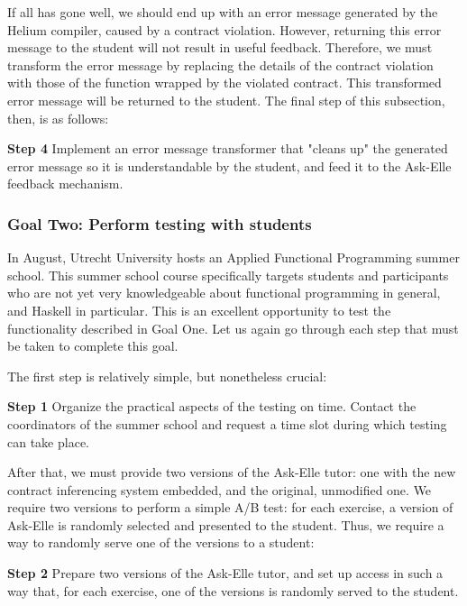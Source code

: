 \documentclass[10pt,a4paper]{article}
\begin{document}
If all has gone well, we should end up with an error message generated by the Helium compiler, caused by a contract violation.
However, returning this error message to the student will not result in useful feedback.
Therefore, we must transform the error message by replacing the details of the contract violation with those of the function wrapped by the violated contract.
This transformed error message will be returned to the student. The final step of this subsection, then, is as follows:

\begin{description}
	\item{\textbf{Step 4}} Implement an error message transformer that "cleans up" the generated error message so it is understandable by the student, and feed it to the Ask-Elle feedback mechanism.
\end{description}

\subsubsection{Goal Two: Perform testing with students}

In August, Utrecht University hosts an Applied Functional Programming summer school.
This summer school course specifically targets students and participants who are not yet very knowledgeable about functional programming in general, and Haskell in particular.
This is an excellent opportunity to test the functionality described in Goal One.
Let us again go through each step that must be taken to complete this goal.

The first step is relatively simple, but nonetheless crucial:

\begin{description}
	\item{\textbf{Step 1}} Organize the practical aspects of the testing on time. Contact the coordinators of the summer school and request a time slot during which testing can take place.
\end{description}

After that, we must provide two versions of the Ask-Elle tutor: one with the new contract inferencing system embedded, and the original, unmodified one.
We require two versions to perform a simple A/B test: for each exercise, a version of Ask-Elle is randomly selected and presented to the student.
Thus, we require a way to randomly serve one of the versions to a student:

\begin{description}
	\item{\textbf{Step 2}} Prepare two versions of the Ask-Elle tutor, and set up access in such a way that, for each exercise, one of the versions is randomly served to the student.
\end{description}
\end{document}
